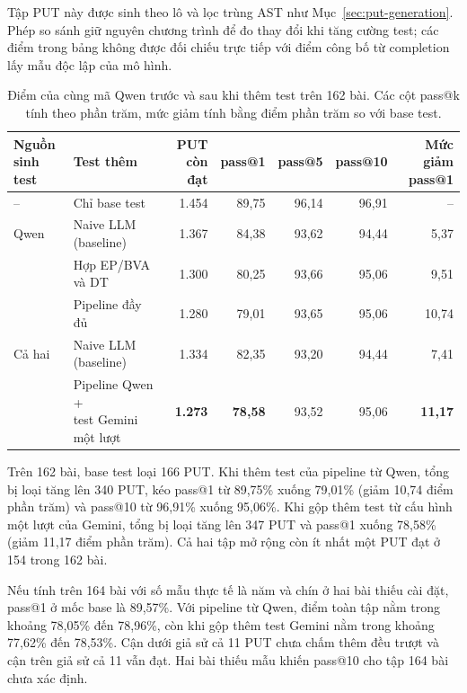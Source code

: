 Tập PUT này được sinh theo lô và lọc trùng AST như Mục~\ref{sec:put-generation}. Phép so sánh giữ nguyên chương trình để đo thay đổi khi tăng cường test; các điểm trong bảng không được đối chiếu trực tiếp với điểm công bố từ completion lấy mẫu độc lập của mô hình.

\begin{table}[!htbp]
\centering
\caption[Điểm pass@k của mã Qwen trước và sau khi thêm test]{Điểm của cùng mã Qwen trước và sau khi thêm test trên 162 bài. Các cột pass@k tính theo phần trăm, mức giảm tính bằng điểm phần trăm so với base test.}
\label{tab:before-after-passk}
\small
\begin{tabular*}{\linewidth}{@{\extracolsep{\fill}}llrrrrr@{}}
\toprule
\shortstack[l]{Nguồn\\sinh test} & Test thêm & \shortstack[r]{PUT\\còn đạt} & pass@1 & pass@5 & pass@10 & \shortstack[r]{Mức giảm\\pass@1} \\
\midrule
-- & Chỉ base test & 1.454 & 89,75 & 96,14 & 96,91 & -- \\
\midrule
Qwen & Naive LLM (baseline) & 1.367 & 84,38 & 93,62 & 94,44 & 5,37 \\
     & Hợp EP/BVA và DT & 1.300 & 80,25 & 93,66 & 95,06 & 9,51 \\
     & Pipeline đầy đủ & 1.280 & 79,01 & 93,65 & 95,06 & 10,74 \\
\midrule
Cả hai & Naive LLM (baseline) & 1.334 & 82,35 & 93,20 & 94,44 & 7,41 \\
       & \shortstack[l]{Pipeline Qwen +\\test Gemini một lượt} & \textbf{1.273} & \textbf{78,58} & 93,52 & 95,06 & \textbf{11,17} \\
\bottomrule
\end{tabular*}
\end{table}

Trên 162 bài, base test loại 166 PUT. Khi thêm test của pipeline từ Qwen, tổng bị loại tăng lên 340 PUT, kéo pass@1 từ 89,75\% xuống 79,01\% (giảm 10,74 điểm phần trăm) và pass@10 từ 96,91\% xuống 95,06\%. Khi gộp thêm test từ cấu hình một lượt của Gemini, tổng bị loại tăng lên 347 PUT và pass@1 xuống 78,58\% (giảm 11,17 điểm phần trăm). Cả hai tập mở rộng còn ít nhất một PUT đạt ở 154 trong 162 bài.

Nếu tính trên 164 bài với số mẫu thực tế là năm và chín ở hai bài thiếu cài đặt, pass@1 ở mốc base là 89,57\%. Với pipeline từ Qwen, điểm toàn tập nằm trong khoảng 78,05\% đến 78,96\%, còn khi gộp thêm test Gemini nằm trong khoảng 77,62\% đến 78,53\%. Cận dưới giả sử cả 11 PUT chưa chấm thêm đều trượt và cận trên giả sử cả 11 vẫn đạt. Hai bài thiếu mẫu khiến pass@10 cho tập 164 bài chưa xác định.

